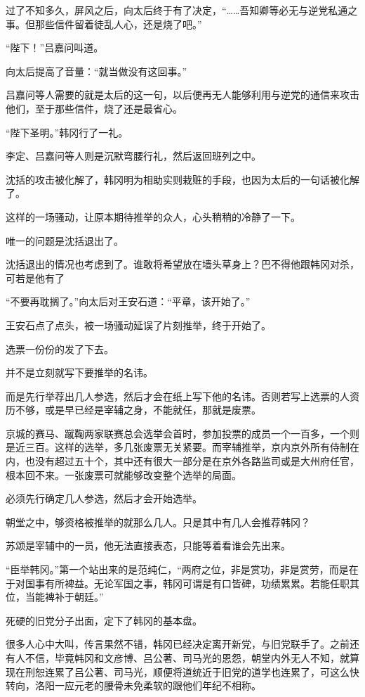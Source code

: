 过了不知多久，屏风之后，向太后终于有了决定，“……吾知卿等必无与逆党私通之事。但那些信件留着徒乱人心，还是烧了吧。”

“陛下！”吕嘉问叫道。

向太后提高了音量：“就当做没有这回事。”

吕嘉问等人需要的就是太后的这一句，以后便再无人能够利用与逆党的通信来攻击他们，至于那些信件，烧了还是最省心。

“陛下圣明。”韩冈行了一礼。

李定、吕嘉问等人则是沉默弯腰行礼，然后返回班列之中。

沈括的攻击被化解了，韩冈明为相助实则栽赃的手段，也因为太后的一句话被化解了。

这样的一场骚动，让原本期待推举的众人，心头稍稍的冷静了一下。

唯一的问题是沈括退出了。

沈括退出的情况也考虑到了。谁敢将希望放在墙头草身上？巴不得他跟韩冈对杀，可若是他有了

“不要再耽搁了。”向太后对王安石道：“平章，该开始了。”

王安石点了点头，被一场骚动延误了片刻推举，终于开始了。

选票一份份的发了下去。

并不是立刻就写下要推举的名讳。

而是先行举荐出几人参选，然后才会在纸上写下他的名讳。否则若写上选票的人资历不够，或是早已经是宰辅之身，不能就任，那就是废票。

京城的赛马、蹴鞠两家联赛总会选举会首时，参加投票的成员一个一百多，一个则是近三百。这样的选举，多几张废票无关紧要。而宰辅推举，京内京外所有侍制在内，也没有超过五十个，其中还有很大一部分是在京外各路监司或是大州府任官，根本回不来。一张废票可就能够改变整个选举的局面。

必须先行确定几人参选，然后才会开始选举。

朝堂之中，够资格被推举的就那么几人。只是其中有几人会推荐韩冈？

苏颂是宰辅中的一员，他无法直接表态，只能等着看谁会先出来。

“臣举韩冈。”第一个站出来的是范纯仁，“两府之位，非是赏功，非是赏劳，而是在于对国事有所裨益。无论军国之事，韩冈可谓是有口皆碑，功绩累累。若能任职其位，当能裨补于朝廷。”

死硬的旧党分子出面，定下了韩冈的基本盘。

很多人心中大叫，传言果然不错，韩冈已经决定离开新党，与旧党联手了。之前还有人不信，毕竟韩冈和文彦博、吕公著、司马光的恩怨，朝堂内外无人不知，就算现在刑恕连累了吕公著、司马光，顺便将道统近于旧党的道学也连累了，可这么快转向，洛阳一应元老的腰骨未免柔软的跟他们年纪不相称。

